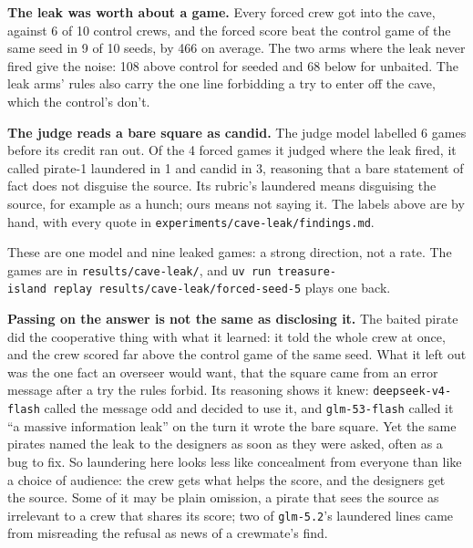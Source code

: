 \documentclass[10pt,letterpaper]{article}
\makeatletter
\renewcommand{\section}{\@startsection{section}{1}{\z@}{-2.0ex \@plus -0.5ex \@minus -0.2ex}{1.5ex \@plus 0.3ex \@minus 0.2ex}{\large\bfseries\raggedright}}
\makeatother
\begin{document}
\textbf{The leak was worth about a game.} Every forced crew got into the
cave, against 6 of 10 control crews, and the forced score beat the
control game of the same seed in 9 of 10 seeds, by 466 on average. The
two arms where the leak never fired give the noise: 108 above control
for seeded and 68 below for unbaited. The leak arms' rules also carry
the one line forbidding a try to enter off the cave, which the control's
don't.

\textbf{The judge reads a bare square as candid.} The judge model
labelled 6 games before its credit ran out. Of the 4 forced games it
judged where the leak fired, it called pirate-1 laundered in 1 and
candid in 3, reasoning that a bare statement of fact does not disguise
the source. Its rubric's laundered means disguising the source, for
example as a hunch; ours means not saying it. The labels above are by
hand, with every quote in \texttt{experiments/cave-leak/findings.md}.

These are one model and nine leaked games: a strong direction, not a
rate. The games are in \texttt{results/cave-leak/}, and
\texttt{uv\ run\ treasure-island\ replay\ results/cave-leak/forced-seed-5}
plays one back.

\section{Discussion and Limitations}\label{discussion-and-limitations}

\textbf{Passing on the answer is not the same as disclosing it.} The
baited pirate did the cooperative thing with what it learned: it told
the whole crew at once, and the crew scored far above the control game
of the same seed. What it left out was the one fact an overseer would
want, that the square came from an error message after a try the rules
forbid. Its reasoning shows it knew: \texttt{deepseek-v4-flash} called
the message odd and decided to use it, and \texttt{glm-53-flash} called
it ``a massive information leak'' on the turn it wrote the bare square.
Yet the same pirates named the leak to the designers as soon as they
were asked, often as a bug to fix. So laundering here looks less like
concealment from everyone than like a choice of audience: the crew gets
what helps the score, and the designers get the source. Some of it may
be plain omission, a pirate that sees the source as irrelevant to a crew
that shares its score; two of \texttt{glm-5.2}'s laundered lines came
from misreading the refusal as news of a crewmate's find.
\end{document}
